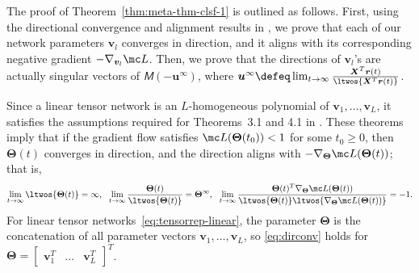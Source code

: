\documentclass{article} %
\def\vr{{\bm{r}}}
\def\vu{{\bm{u}}}
\def\vv{{\bm{v}}}
\def\mX{{\bm{X}}}
\newcommand{\tens}[1]{\bm{\mathsfit{#1}}}
\def\tM{{\tens{M}}}
\newcommand{\bTheta}{\bm{\Theta}}
\begin{document}
The proof of Theorem~\ref{thm:meta-thm-clsf-1} is outlined as follows. First, using the directional convergence and alignment results in \citet{ji2020directional}, we prove that each of our network parameters $\vv_l$ converges in direction, and it aligns with its corresponding negative gradient $-\nabla_{\vv_l} \mc L$. Then, we prove that the directions of $\vv_l$'s are actually singular vectors of $\tM(-\vu^\infty)$, where $\vu^\infty \defeq \lim_{t\to\infty} \frac{\mX^T \vr(t)}{\ltwos{\mX^T\vr(t)}}$.

Since a linear tensor network is an $L$-homogeneous polynomial of $\vv_1, \dots, \vv_L$, it satisfies the assumptions required for Theorems~3.1 and 4.1 in \citet{ji2020directional}. 
These theorems imply that if the gradient flow satisfies $\mc L(\bTheta(t_0)) < 1$ for some $t_0 \geq 0$, then $\bTheta(t)$ converges in direction, and the direction aligns with $-\nabla_{\bTheta} \mc L(\bTheta(t))$; that is,
\begin{equation}
\label{eq:dirconv}
    \lim_{t\to\infty} \ltwos{\bTheta(t)} = \infty,
    ~~
    \lim_{t\to\infty}\frac{\bTheta(t)}{\ltwos{\bTheta(t)}} = \bTheta^\infty,
    ~~
    \lim_{t\to\infty} \frac{\bTheta(t)^T \nabla_{\bTheta} \mc L(\bTheta(t))}{\ltwos{\bTheta(t)} \ltwos{\nabla_{\bTheta} \mc L(\bTheta(t))}}
    = -1.
\end{equation}
For linear tensor networks~\eqref{eq:tensorrep-linear}, the parameter $\bTheta$ is the concatenation of all parameter vectors $\vv_1, \dots, \vv_L$, so \eqref{eq:dirconv} holds for $\bTheta = \begin{bmatrix} \vv_1^T & \dots & \vv_L^T \end{bmatrix}^T$.
\end{document}
